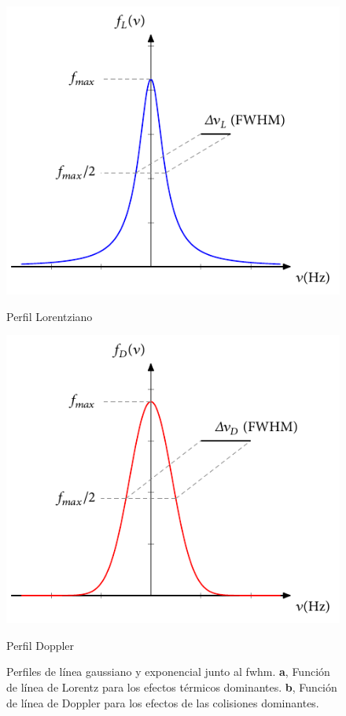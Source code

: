 \begin{figure}[htbp]
  \centering
  \begin{subcaptionblock}{.4\textwidth}
    \centering
    \includegraphics[width=\textwidth]{Figuras/ch1_lorentz.pdf}
    \caption{Perfil Lorentziano}\label{fig:ch1_linefuna}
  \end{subcaptionblock}
  \begin{subcaptionblock}{.4\textwidth}
    \centering
    \includegraphics[width=\textwidth]{Figuras/ch1_doppler.pdf}
    \caption{Perfil Doppler}\label{fig:ch1_linefunb}
  \end{subcaptionblock}
  \caption{Perfiles de línea gaussiano y exponencial junto al \acrshort{fwhm}. \textbf{a}, Función de línea de Lorentz para los efectos térmicos dominantes. \textbf{b}, Función de línea de Doppler para los efectos de las colisiones dominantes.}
  \label{fig:ch1_linefun}
\end{figure}

